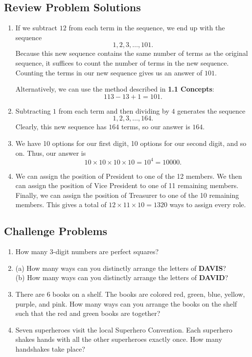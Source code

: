 \documentclass[12pt, letterpaper]{article}
\begin{document}
\newpage
\subsection{Review Problem Solutions}

\begin{enumerate}
    \item If we subtract $12$ from each term in the sequence, we end up with the sequence
    $$1, 2, 3,\ldots,101.$$
    Because this new sequence contains the same number of terms as the original sequence, it suffices
    to count the number of terms in the new sequence. Counting the terms in our new sequence gives us an answer of $\boxed{101}$.
    
    Alternatively, we can use the method described in \textbf{1.1 Concepts}:
    $$113 - 13 + 1 = \boxed{101}.$$
    \item Subtracting $1$ from each term and then dividing by $4$ generates the sequence
    $$1, 2, 3,\ldots, 164.$$
    Clearly, this new sequence has $164$ terms, so our answer is $\boxed{164}$.
    \item We have 10 options for our first digit, 10 options for our second digit, and so on. Thus, our answer is
    $$10 \times 10 \times 10 \times 10 = 10^4 = \boxed{10000}.$$
    \item We can assign the position of President to one of the 12 members. We then can assign the position of Vice President to one of 11 remaining members. Finally, we can assign the position of Treasurer to one of the 10 remaining members. This gives a total of $12 \times 11 \times 10 = \boxed{1320}$ ways to assign every role.
\end{enumerate}

\subsection{Challenge Problems}

\begin{enumerate}
    \item How many 3-digit numbers are perfect squares?
    \item (a) How many ways can you distinctly arrange the letters of \textbf{DAVIS}?\\
    (b) How many ways can you distinctly arrange the letters of \textbf{DAVID}?
    \item There are 6 books on a shelf. The books are colored red, green, blue, yellow, purple, and pink. How many ways can you arrange the books on the shelf such that the red and green books are together?
    \item Seven superheroes visit the local Superhero Convention. Each superhero shakes hands with all the other superheroes exactly once. How many handshakes take place?
\end{enumerate}
\end{document}
